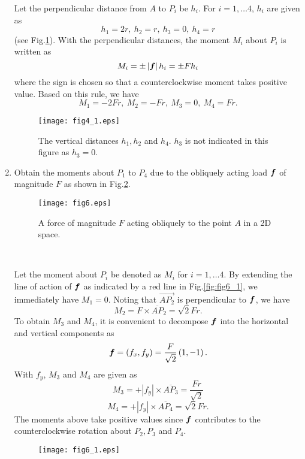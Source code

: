 \documentclass[10pt,a4j]{article}
\begin{document}
\begin{enumerate}
	{\small
		Let the perpendicular distance from $A$ to $P_i$ be $h_i$. 
		For $i=1,\dots 4$, $h_i$ are given as 
		\[
			h_1=2r, \ h_2=r, \ h_3=0, \ h_4=r
		\]
		(see Fig.\ref{fig:fig4_1}). With the perpendicular distances, 
		the moment $M_i$ about $P_i$ is written as 
		\[
			M_i=\pm \left| \mbox{\boldmath $f$} \right| h_i= \pm Fh_i
		\]	
		where the sign is chosen so that a counterclockwise moment takes positive value.
		Based on this rule, we have 
		\[
			M_1=-2Fr, \ M_2=-Fr, \ M_3=0, \ M_4=Fr.
		\]
		\begin{figure}[h]
		\begin{center}
		\texttt{[image: fig4\_1.eps]} 
		\end{center}
			\caption{The vertical distances $h_1,h_2$ and $h_4$. $h_3$ is not 
			indicated in this figure as $h_3=0$.}
		\label{fig:fig4_1}
		\end{figure}
	}
\item
	Obtain the moments about $P_1$ to $P_4$ due to the obliquely acting load $\mbox{\boldmath $f$}$ 
	of magnitude $F$ as shown in Fig.\ref{fig:fig6}.
	\begin{figure}[h]
		\begin{center}
		\texttt{[image: fig6.eps]} 
		\end{center}
		\caption{A force of magnitude $F$ acting obliquely to the point $A$ in a 2D space.} 
		\label{fig:fig6}
	\end{figure}
	\\
	{\small
		Let the moment about $P_i$ be denoted as $M_i$ for $i=1,\dots 4$.
		By extending the line of action of $\mbox{\boldmath $f$}$ as indicated by 
		a red line in Fig.\ref{fig:fig6_1}, we immediately have $M_1=0$.
		Noting that $\overrightarrow{AP_2}$ is perpendicular to $\mbox{\boldmath $f$}$, 
		we have 
		\[ 
			M_2=F\times \overline{AP}_2=\sqrt{2}Fr.
		\]
		To obtain $M_3$ and $M_4$, it is convenient to decompose $\mbox{\boldmath $f$}$ into 
		the horizontal and vertical components as 
		\[
			\mbox{\boldmath $f$}=(f_x,f_y)=\frac{F}{\sqrt{2}}\left(1, -1\right).
		\]
		With $f_y$, $M_3$ and $M_4$ are given as 
		\[
			M_3=+\left|f_y\right| \times \overline{A P_3}=\frac{Fr}{\sqrt{2}}
		\]
		\[
			M_4=+\left|f_y \right| \times \overline{A P_4}=\sqrt{2}Fr.
		\]
		The moments above take positive values since $\mbox{\boldmath $f$}$ contributes 
		to the counterclockwise rotation about $P_2, P_3$ and $P_4$.
		\begin{figure}[h]
		\begin{center}
		\texttt{[image: fig6\_1.eps]} 
		\end{center}

\end{figure}}
\end{enumerate}
\end{document}
